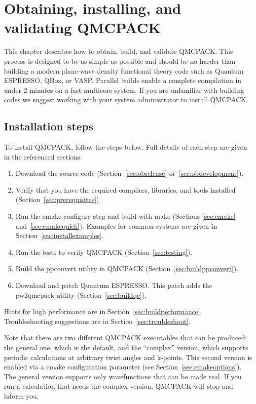 \chapter{Obtaining, installing, and validating QMCPACK}
\label{chap:obtaininginstalling}

This chapter describes how to obtain, build, and validate QMCPACK. This process is designed to be as simple as
possible and should be no harder than building a modern plane-wave density
functional theory code such as Quantum ESPRESSO, QBox, or
VASP. Parallel builds enable a complete
compilation in under 2 minutes on a fast multicore system. If you
are unfamiliar with building codes we suggest working with your system
administrator to install QMCPACK.

\section{Installation steps}
To install QMCPACK, follow the steps below. Full details of
each step are given in the referenced sections.
\begin{enumerate}
\item Download the source code (Section~\ref{sec:obrelease} or~\ref{sec:obdevelopment}).
\item Verify that you have the required compilers, libraries, and tools
  installed (Section~\ref{sec:prerequisites}).
\item Run the cmake configure step and build with make (Sections
  \ref{sec:cmake} and~\ref{sec:cmakequick}). Examples for common
  systems are given in Section~\ref{sec:installexamples}.
\item Run the tests to verify QMCPACK (Section~\ref{sec:testing}).
\item Build the ppconvert utility in QMCPACK (Section~\ref{sec:buildppconvert}).
\item Download and patch Quantum ESPRESSO. This patch adds the
  pw2qmcpack utility (Section~\ref{sec:buildqe}).
\end{enumerate}

Hints for high performance are in Section~\ref{sec:buildperformance}. Troubleshooting suggestions are in Section~\ref{sec:troubleshoot}.

Note that there are two different QMCPACK executables that can be
produced: the general one, which is the default, and the ``complex''
version, which supports periodic calculations at arbitrary twist angles and
k-points. This second version is enabled via a cmake configuration
parameter (see Section~\ref{sec:cmakeoptions}). The general version
 supports only wavefunctions that can be made real. If you run a
calculation that needs the complex version, QMCPACK will stop and inform you.


